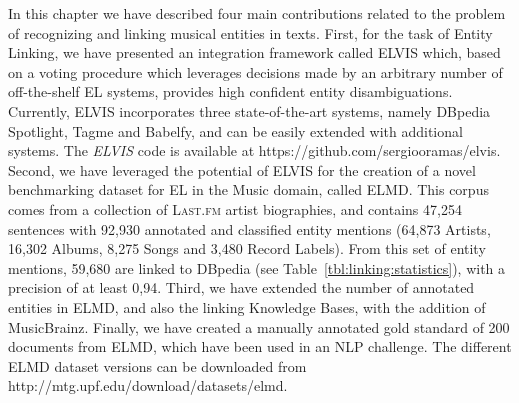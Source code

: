 In this chapter we have described four main contributions related to the problem of recognizing and linking musical entities in texts. First, for the task of Entity Linking, we have presented an integration framework called \textsc{ELVIS} which, based on a voting procedure which leverages decisions made by an arbitrary number of off-the-shelf EL systems, provides high confident entity disambiguations. Currently, \textsc{ELVIS} incorporates three state-of-the-art systems, namely DBpedia Spotlight, Tagme and Babelfy, and can be easily extended with additional systems. The \textit{ELVIS} code is available at {\footnotesize{https://github.com/sergiooramas/elvis}}. Second, we have leveraged the potential of \textsc{ELVIS} for the creation of a novel benchmarking dataset for EL in the Music domain, called \textsc{ELMD}. This corpus comes from a collection of \textsc{Last.fm} artist biographies, and contains 47,254 sentences with 92,930 annotated and classified entity mentions (64,873 Artists, 16,302 Albums, 8,275 Songs and 3,480 Record Labels). From this set of entity mentions, 59,680 are linked to DBpedia (see Table~\ref{tbl:linking:statistics}), with a precision of at least 0,94.
Third, we have extended the number of annotated entities in ELMD, and also the linking Knowledge Bases, with the addition of MusicBrainz.
Finally, we have created a manually annotated gold standard of 200 documents from ELMD, which have been used in an NLP challenge.
The different \textsc{ELMD} dataset versions can be downloaded from {\footnotesize{http://mtg.upf.edu/download/datasets/elmd}}.

